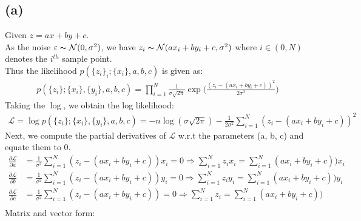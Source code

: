 \documentclass[11pt, fleqn]{article}
\begin{document}
\subsection*{(a)}
Given $z = ax + by +c$. \\
As the noise $\varepsilon \thicksim \mathcal{N}(0, \sigma^2)$, we have $ z_i \thicksim \mathcal{N}(a x_i + b y_i + c, \sigma^2) $ where $i \in (0, N)$ denotes the $i^{th}$ sample point. \\
Thus the likelihood $p(\{z_i\}_i; \{x_i\}, a, b, c)$ is given as:
\begin{equation*}
    \begin{split}
        p(\{z_i\}; \{x_i\}, \{y_i\}, a, b, c) = \prod_{i=1}^{N}\frac{1}{\sigma\sqrt{2\pi}} \exp{\bigg(\frac{(z_i - (ax_i + by_i + c))^2}{2\sigma^2}\bigg)}
    \end{split}
\end{equation*}
Taking the $\log$, we obtain the log likelihood:
\begin{equation}
    \label{logl1}
    \begin{split}
        \boxed{\mathcal{L} = \log{p(\{z_i\}; \{x_i\}, \{y_i\}, a, b, c)} = - n\log(\sigma\sqrt{2\pi}) -\frac{1}{{2\sigma^2}}\sum_{i=1}^{N} (z_i - (ax_i + by_i + c))^2 }
    \end{split}
\end{equation}
Next, we compute the partial derivatives of $\mathcal{L}$ w.r.t the parameters (a, b, c) and equate them to 0.
\begin{equation*}
    \begin{split}
        \frac{\partial \mathcal{L}}{\partial a} &= \frac{1}{{\sigma^2}}\sum_{i=1}^{N} (z_i - (ax_i + by_i + c)) x_i = 0 \Longrightarrow \sum_{i=1}^{N} z_ix_i = \sum_{i=1}^{N} (ax_i + by_i + c)) x_i \\
        \frac{\partial \mathcal{L}}{\partial b} &= \frac{1}{{\sigma^2}}\sum_{i=1}^{N} (z_i - (ax_i + by_i + c)) y_i = 0 \Longrightarrow \sum_{i=1}^{N} z_iy_i = \sum_{i=1}^{N} (ax_i + by_i + c)) y_i \\
        \frac{\partial \mathcal{L}}{\partial c} &= \frac{1}{{\sigma^2}}\sum_{i=1}^{N} (z_i - (ax_i + by_i + c)) = 0 \Longrightarrow \sum_{i=1}^{N} z_i = \sum_{i=1}^{N} (ax_i + by_i + c)) \\
    \end{split}
\end{equation*}
Matrix and vector form:
\end{document}
